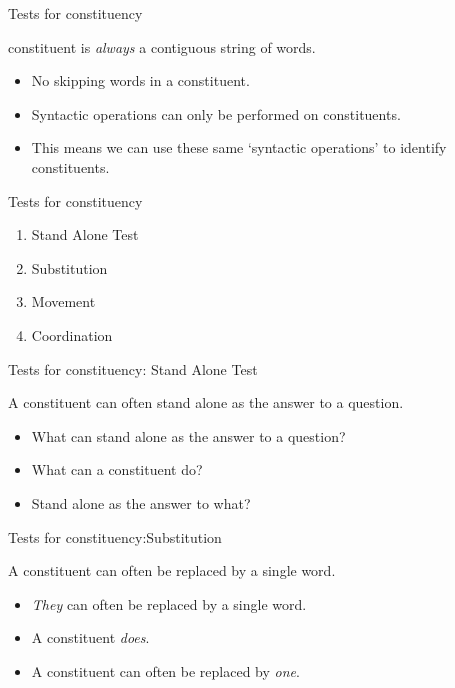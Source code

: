\documentclass[9pt,xcolor=pdftex,dvipsnames,table]{beamer}
\begin{document}
\begin{frame}{Tests for constituency}
\begin{center} constituent is \emph{always} a contiguous string of words. \end{center}
\begin{itemize}
     \item No skipping words in a constituent.
     \item Syntactic operations can only be performed on constituents.
     \item This means we can use these same `syntactic operations' to identify constituents.
\end{itemize}
\end{frame}

\begin{frame}{Tests for constituency}
\begin{enumerate}
     \item Stand Alone Test
     \item Substitution
     \item Movement
     \item Coordination
\end{enumerate}
\end{frame}

\begin{frame}{Tests for constituency: Stand Alone Test}
\begin{center}
     {\large A constituent can often stand alone as the answer to a question. }
\end{center}
\begin{itemize}
     \item What can stand alone as the answer to a question?\pause
     \item What can a constituent do? \pause
     \item Stand alone as the answer to what?
\end{itemize}
\end{frame}

\begin{frame}{Tests for constituency:Substitution}
\begin{center}
     {\large A constituent can often be replaced by a single word.}
\end{center}
\begin{itemize}
     \item \emph{They} can often be replaced by a single word. \pause
     \item A constituent \emph{does}. \pause
     \item A constituent can often be replaced by \emph{one}.
\end{itemize}
\end{frame}
\end{document}
